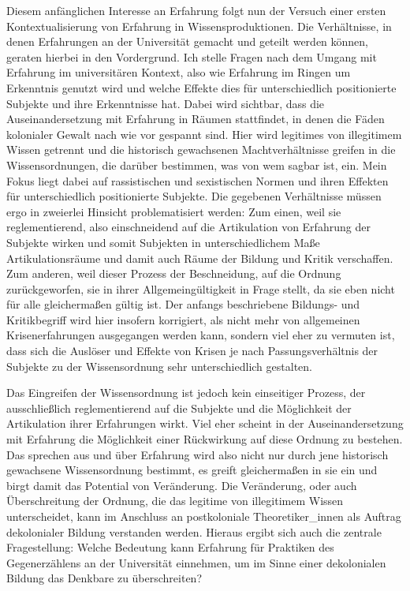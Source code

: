 Diesem anfänglichen Interesse an Erfahrung folgt nun der Versuch einer ersten
Kontextualisierung von Erfahrung in Wissensproduktionen. Die Verhältnisse, in
denen Erfahrungen an der Universität gemacht und geteilt werden können, geraten
hierbei in den Vordergrund. Ich stelle Fragen nach dem Umgang mit Erfahrung im
universitären Kontext, also wie Erfahrung im Ringen um Erkenntnis genutzt wird
und welche Effekte dies für unterschiedlich positionierte Subjekte und ihre
Erkenntnisse hat. Dabei wird sichtbar, dass die Auseinandersetzung mit Erfahrung
in Räumen stattfindet, in denen die Fäden kolonialer Gewalt nach wie vor
gespannt sind. Hier wird legitimes von illegitimem Wissen getrennt und die
historisch gewachsenen Machtverhältnisse greifen in die Wissensordnungen, die
darüber bestimmen, was von wem sagbar ist, ein. Mein Fokus liegt dabei auf
rassistischen und sexistischen Normen und ihren Effekten für unterschiedlich
positionierte Subjekte. Die gegebenen Verhältnisse müssen ergo in zweierlei
Hinsicht problematisiert werden: Zum einen, weil sie reglementierend, also
einschneidend auf die Artikulation von Erfahrung der Subjekte wirken und somit
Subjekten in unterschiedlichem Maße Artikulationsräume und damit auch Räume der
Bildung und Kritik verschaffen. Zum anderen, weil dieser Prozess der
Beschneidung, auf die Ordnung zurückgeworfen, sie in ihrer Allgemeingültigkeit
in Frage stellt, da sie eben nicht für alle gleichermaßen gültig ist. Der
anfangs beschriebene Bildungs- und Kritikbegriff wird hier insofern korrigiert,
als nicht mehr von allgemeinen Krisenerfahrungen ausgegangen werden kann,
sondern viel eher zu vermuten ist, dass sich die Auslöser und Effekte von Krisen
je nach Passungsverhältnis der Subjekte zu der Wissensordnung sehr
unterschiedlich gestalten.

Das Eingreifen der Wissensordnung ist jedoch kein einseitiger Prozess, der
ausschließlich reglementierend auf die Subjekte und die Möglichkeit der
Artikulation ihrer Erfahrungen wirkt. Viel eher scheint in der
Auseinandersetzung mit Erfahrung die Möglichkeit einer Rückwirkung auf diese
Ordnung zu bestehen. Das sprechen aus und über Erfahrung wird also nicht nur
durch jene historisch gewachsene Wissensordnung bestimmt, es greift
gleichermaßen in sie ein und birgt damit das Potential von Veränderung. Die
Veränderung, oder auch Überschreitung der Ordnung, die das legitime von
illegitimem Wissen unterscheidet, kann im Anschluss an postkoloniale
Theoretiker\_innen als Auftrag dekolonialer Bildung verstanden werden. Hieraus
ergibt sich auch die zentrale Fragestellung: Welche Bedeutung kann Erfahrung für
Praktiken des Gegenerzählens an der Universität einnehmen, um im Sinne einer
dekolonialen Bildung das Denkbare zu überschreiten?\\ 

